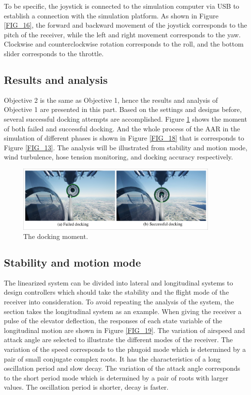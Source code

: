 To be specific, the joystick is connected to the simulation computer via USB to establish a connection with the simulation platform. As shown in Figure \ref{FIG_16}, the forward and backward movement of the joystick corresponds to the pitch of the receiver, while the left and right movement corresponds to the yaw. Clockwise and counterclockwise rotation corresponds to the roll, and the bottom slider corresponds to the throttle. 

\subsection{Results and analysis}\label{sec5.4}
Objective 2 is the same as Objective 1, hence the results and analysis of Objective 1 are presented in this part. Based on the settings and designs before, several successful docking attempts are accomplished. Figure \ref{FIG_17} shows the moment of both failed and successful docking. And the whole process of the AAR in the simulation of different phases is shown in Figure \ref{FIG_18} that is corresponds to Figure \ref{FIG_13}. The analysis will be illustrated from stability and motion mode, wind turbulence, hose tension monitoring, and docking accuracy respectively.
\begin{figure}[th]
	\centering
	\includegraphics[width=0.9\textwidth]{Figures/Figs_Ch5/Fig17.pdf}
	\caption{The docking moment.}\label{FIG_17}
\end{figure}
\subsection{ Stability and motion mode}\label{sec5.4.1}
The linearized system can be divided into lateral and longitudinal systems to design controllers which should take the stability and the flight mode of the receiver into consideration. To avoid repeating the analysis of the system, the section takes the longitudinal system as an example. When giving the receiver a pulse of the elevator deflection, the responses of each state variable of the longitudinal motion are shown in Figure \ref{FIG_19}. The variation of airspeed and attack angle are selected to illustrate the different modes of the receiver. The variation of the speed corresponds to the phugoid mode which is determined by a pair of small conjugate complex roots. It has the characteristics of a long oscillation period and slow decay. The variation of the attack angle corresponds to the short period mode which is determined by a pair of roots with larger values. The oscillation period is shorter, decay is faster.

